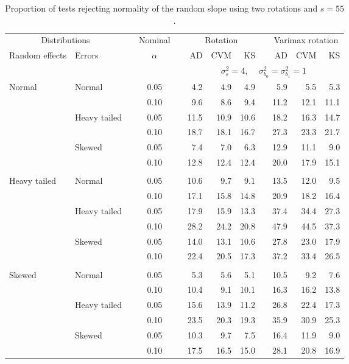 \begin{table}[ht]
\centering
\caption{\label{tab:fixedsimb155} Proportion of tests rejecting normality of the random slope using two rotations and $s = 55$.}
\begin{scriptsize}
\begin{tabular}{ll p{.1cm} c p{.1cm} rrr p{.1cm} rrr}
  \hline
  \multicolumn{2}{c}{Distributions}& & Nominal & &  \multicolumn{3}{c}{Rotation} & & \multicolumn{3}{c}{Varimax rotation} \\ \cline{1-2} \cline{6-8} \cline{10-12}   
  Random effects & Errors & & $\alpha$ & & AD & CVM & KS & & AD & CVM & KS \\ 
   \hline
& && && \multicolumn{7}{c}{$\sigma_{\varepsilon}^2 = 4$, \ \ $\sigma_{b_0}^2 = \sigma_{b_1}^2 = 1$} \\ \cline{6-12}
\rowcolor{gray!20} Normal & Normal &  & 0.05 &  & 4.2 & 4.9 & 4.9 &  & 5.9 & 5.5 & 5.3 \\ 
\rowcolor{gray!20}    &  &  & 0.10 &  & 9.6 & 8.6 & 9.4 &  & 11.2 & 12.1 & 11.1 \\ 
\rowcolor{gray!20}    & Heavy tailed &  & 0.05 &  & 11.5 & 10.9 & 10.6 &  & 18.2 & 16.3 & 14.7 \\ 
\rowcolor{gray!20}    &  &  & 0.10 &  & 18.7 & 18.1 & 16.7 &  & 27.3 & 23.3 & 21.7 \\ 
\rowcolor{gray!20}    & Skewed &  & 0.05 &  & 7.4 & 7.0 & 6.3 &  & 12.9 & 11.1 & 9.0 \\ 
\rowcolor{gray!20}    &  &  & 0.10 &  & 12.8 & 12.4 & 12.4 &  & 20.0 & 17.9 & 15.1 \\ 
&&&&&&&&&&&\\
  Heavy tailed & Normal &  & 0.05 &  & 10.6 & 9.7 & 9.1 &  & 13.5 & 12.0 & 9.5 \\ 
   &  &  & 0.10 &  & 17.1 & 15.8 & 14.8 &  & 20.9 & 18.2 & 16.4 \\ 
   & Heavy tailed &  & 0.05 &  & 17.9 & 15.9 & 13.3 &  & 37.4 & 34.4 & 27.3 \\ 
   &  &  & 0.10 &  & 28.2 & 24.2 & 20.8 &  & 47.9 & 44.5 & 37.3 \\ 
   & Skewed &  & 0.05 &  & 14.0 & 13.1 & 10.6 &  & 27.8 & 23.0 & 17.9 \\ 
   &  &  & 0.10 &  & 22.4 & 20.5 & 17.3 &  & 37.2 & 33.4 & 26.5 \\ 
&&&&&&&&&&&\\
  Skewed & Normal &  & 0.05 &  & 5.3 & 5.6 & 5.1 &  & 10.5 & 9.2 & 7.6 \\ 
   &  &  & 0.10 &  & 10.4 & 9.1 & 10.1 &  & 16.3 & 16.2 & 13.8 \\ 
   & Heavy tailed &  & 0.05 &  & 15.6 & 13.9 & 11.2 &  & 26.8 & 22.4 & 17.3 \\ 
   &  &  & 0.10 &  & 23.5 & 20.3 & 19.3 &  & 35.9 & 30.9 & 25.3 \\ 
   & Skewed &  & 0.05 &  & 10.3 & 9.7 & 7.5 &  & 16.4 & 11.9 & 9.0 \\ 
   &  &  & 0.10 &  & 17.5 & 16.5 & 15.0 &  & 28.1 & 20.8 & 16.9 \\ 



\end{tabular}
\end{scriptsize}
\end{table}
